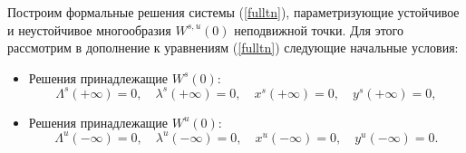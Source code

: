 Построим формальные решения системы (\ref{fulltn}), параметризующие устойчивое и неустойчивое многообразия $W^{s,u}(0)$ неподвижной точки. Для этого рассмотрим в дополнение к уравнениям (\ref{fulltn}) следующие начальные условия:
    
\begin{itemize}
\item Решения принадлежащие $W^s(0)$:
\begin{equation*}
        \Lambda^{s}(+ \infty) = 0, \quad
        \lambda^{s}(+ \infty) = 0, \quad
        x^{s}(+ \infty) = 0, \quad
        y^{s}(+ \infty) = 0,
    \label{border}
\end{equation*}
\item Решения принадлежащие $W^u(0)$:
\begin{equation*}
        \Lambda^{u}(- \infty) = 0, \quad
        \lambda^{u}(- \infty) = 0, \quad
        x^{u}(- \infty) = 0, \quad
        y^{u}(- \infty) = 0.
\end{equation*}
\end{itemize}

   

